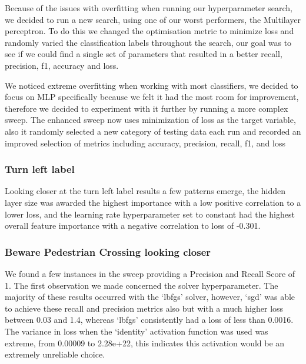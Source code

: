 \documentclass[11pt]{article}
\begin{document}
Because of the issues with overfitting when running our hyperparameter search, we decided to run a new search, using one of our worst performers, the Multilayer perceptron.
To do this we changed the optimisation metric to minimize loss and randomly varied the classification labels throughout the search, our goal was to see if we could find a single set of parameters that resulted in a better recall, precision, f1, accuracy and loss.

We noticed extreme overfitting when working with most classifiers, we decided to focus on  MLP specifically because we felt it had the most room for improvement, therefore we decided to experiment with it further by running a more complex sweep.
The enhanced sweep now uses minimization of loss as the target variable, also it randomly selected a new category of testing data each run and recorded an improved selection of metrics including accuracy, precision, recall, f1, and loss

\subsubsection{Turn left label}
Looking closer at the turn left label results a few patterns emerge, the hidden layer size was awarded the highest importance with a low positive correlation to a lower loss, and the learning rate hyperparameter set to constant had the highest overall feature importance with a negative correlation to loss of -0.301.


\subsubsection{Beware Pedestrian Crossing looking closer}
We found a few instances in the sweep providing a Precision and Recall Score of 1. The first observation we made concerned the solver hyperparameter. The majority of these results occurred with the ‘lbfgs’ solver, however, ‘sgd’ was able to achieve these recall and precision metrics also but with a much higher loss between 0.03 and 1.4, whereas ‘lbfgs’ consistently had a loss of less than 0.0016.
The variance in loss when the ‘identity’ activation function was used was extreme, from 0.00009 to 2.28e+22, this indicates this activation would be an extremely unreliable choice. 
\end{document}
